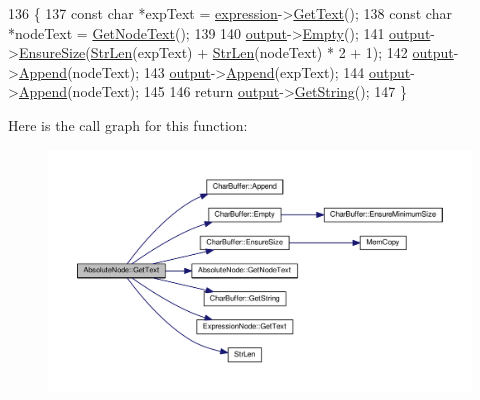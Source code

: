 \begin{DoxyCode}
136 \{
137     \textcolor{keyword}{const} \textcolor{keywordtype}{char} *expText = \hyperlink{classAbsoluteNode_a1b1bea1b153597964e64c7e15f0aa9e1}{expression}->\hyperlink{classExpressionNode_a0bbf243108a14eaf963a8161ffd8eb92}{GetText}();
138     \textcolor{keyword}{const} \textcolor{keywordtype}{char} *nodeText = \hyperlink{classAbsoluteNode_ae5e2148cb9fedaee9137d3c124399c76}{GetNodeText}();
139 
140     \hyperlink{classSyntaxNode_a1180628cbe3fce43930cee0df5a9ce5c}{output}->\hyperlink{classCharBuffer_abe39d3fd7d8b9c8ec343af2cae7adc96}{Empty}();
141     \hyperlink{classSyntaxNode_a1180628cbe3fce43930cee0df5a9ce5c}{output}->\hyperlink{classCharBuffer_ad1907009b5ad136692b989fa96bf2f7e}{EnsureSize}(\hyperlink{clib_8h_a67ec56eb98b49515d35005a5b3bf9a32}{StrLen}(expText) + \hyperlink{clib_8h_a67ec56eb98b49515d35005a5b3bf9a32}{StrLen}(nodeText) * 2 + 1);
142     \hyperlink{classSyntaxNode_a1180628cbe3fce43930cee0df5a9ce5c}{output}->\hyperlink{classCharBuffer_a045b38735f7b3007c1b98d3d7b7feafe}{Append}(nodeText);
143     \hyperlink{classSyntaxNode_a1180628cbe3fce43930cee0df5a9ce5c}{output}->\hyperlink{classCharBuffer_a045b38735f7b3007c1b98d3d7b7feafe}{Append}(expText);
144     \hyperlink{classSyntaxNode_a1180628cbe3fce43930cee0df5a9ce5c}{output}->\hyperlink{classCharBuffer_a045b38735f7b3007c1b98d3d7b7feafe}{Append}(nodeText);
145 
146     \textcolor{keywordflow}{return} \hyperlink{classSyntaxNode_a1180628cbe3fce43930cee0df5a9ce5c}{output}->\hyperlink{classCharBuffer_a7dfd3feaaf80f318ba44efe15b1ec44b}{GetString}();
147 \}
\end{DoxyCode}


Here is the call graph for this function\+:
\nopagebreak
\begin{figure}[H]
\begin{center}
\leavevmode
\includegraphics[width=350pt]{d4/dfd/classAbsoluteNode_ada1094b5e5ed6033f193ac151058c364_cgraph}
\end{center}
\end{figure}



